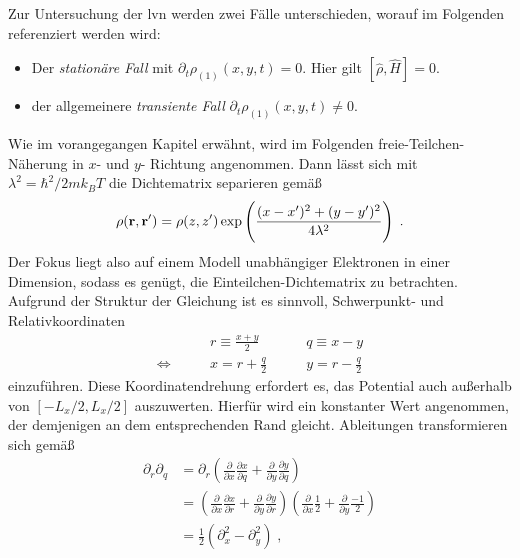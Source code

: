 Zur Untersuchung der \ac{lvn} werden zwei Fälle unterschieden, worauf im Folgenden referenziert werden wird:
\begin{itemize}
  \item Der \emph{stationäre Fall} mit $\partial_t \rho_{(1)}(x,y,t) = 0$. Hier gilt ${\left[\hat{\rho} , \hat{H}\right]=0}$.
  \item der allgemeinere \emph{transiente Fall} $\partial_t \rho_{(1)}(x,y,t) \neq 0$.
\end{itemize}
Wie im vorangegangen Kapitel erwähnt, wird im Folgenden freie-Teilchen-Näherung in $x$- und $y$- Richtung angenommen. Dann lässt sich mit $\lambda^2 = \hbar^2/2mk_B T$ die Dichtematrix separieren \cite{grubin1993transport} gemäß
\begin{equation}
  \rho(\vb{r},\vb{r}') = \rho({z},{z}') \exp\left( \frac{(x-x')^2 + (y-y')^2}{4\lambda^2}\right) \; .
\end{equation}
Der Fokus liegt also auf einem Modell unabhängiger Elektronen in einer Dimension, sodass es genügt, die Einteilchen-Dichtematrix zu betrachten.
Aufgrund der Struktur der Gleichung ist es sinnvoll, Schwerpunkt- und Relativkoordinaten
\begin{equation}
  \begin{aligned}
    &r \equiv \frac{x+y}{2} \qquad &q \equiv x-y \\
    \Leftrightarrow\qquad &x = r+\frac{q}{2} \qquad &y = r-\frac{q}{2}
  \end{aligned}
  \label{eq:gedrehteKoordinaten}
\end{equation}
einzuführen. Diese Koordinatendrehung erfordert es, das Potential auch außerhalb von $[-L_x/2, L_x/2]$ auszuwerten. Hierfür wird ein konstanter Wert angenommen, der demjenigen an dem entsprechenden Rand gleicht.
Ableitungen transformieren sich gemäß
\begin{equation*}
  \begin{aligned}
    \partial_r \partial_q  &= \partial_r \left( \frac{\partial}{\partial x} \frac{\partial x}{\partial q} + \frac{\partial}{\partial y} \frac{\partial y}{\partial q}\right) \\
     &= \left( \frac{\partial}{\partial x} \frac{\partial x}{\partial r} + \frac{\partial}{\partial y} \frac{\partial y}{\partial r}\right) \left( \frac{\partial}{\partial x} \frac{1}{2} + \frac{\partial}{\partial y} \frac{-1}{2}\right)\\
    &=  \frac{1}{2}(\partial_x^2 - \partial_y^2) \; ,
  \end{aligned}
\end{equation*}
